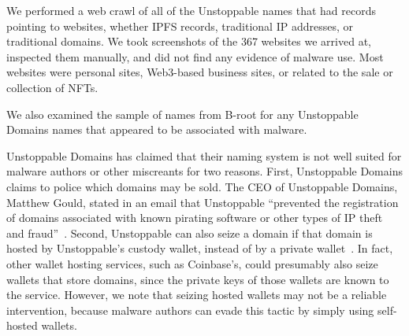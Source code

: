 We performed a web crawl of all of the Unstoppable names that 
had records pointing to websites, whether IPFS records, 
traditional IP addresses, or traditional domains. We took 
screenshots of the 367 websites we arrived 
at, inspected them manually, and did not find any evidence of 
malware use. Most 
websites were personal sites, Web3-based business sites, or related to the sale 
or collection of NFTs. 

We also examined the sample of names from B-root for any Unstoppable Domains 
names that appeared to be associated with malware. 

Unstoppable Domains has claimed that their naming system is not well suited for 
malware authors or other miscreants for two reasons. First, Unstoppable Domains 
claims to police which domains may be sold. The CEO of Unstoppable Domains, 
Matthew Gould, stated in an email that Unstoppable ``prevented the 
registration of domains associated with known pirating software or other types 
of IP theft and fraud''~\cite{pegoraro_blockchain_2021}. Second, Unstoppable 
can also seize a domain if that 
domain is hosted by Unstoppable's custody 
wallet, instead of by a private wallet~\cite{pegoraro_blockchain_2021}. In 
fact, other wallet hosting 
services, such as Coinbase's, 
could presumably also seize wallets that store domains, since the private 
keys of those wallets are 
known to the service. However, we note that seizing hosted wallets may not 
be a reliable 
intervention, because malware authors can evade this tactic by simply using 
self-hosted wallets. 

